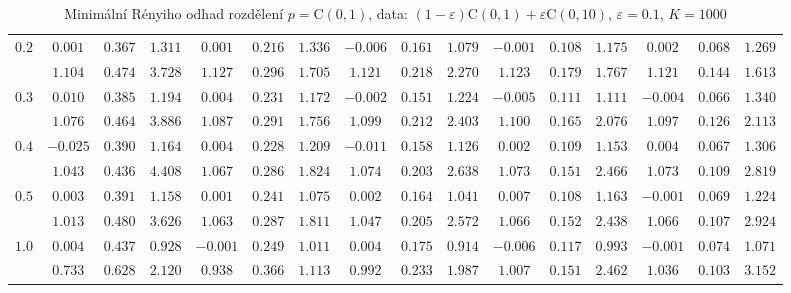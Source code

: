 \begin{table}[ht]
\begin{center}
\begin{tabular}{|c|ccc|ccc|ccc|ccc|ccc|}
\hline 
$0.2$ & $ 0.001 $ & $ 0.367 $ & $ 1.311 $ & $ 0.001 $ & $ 0.216 $ & $ 1.336 $ & $ -0.006 $ & $ 0.161 $ & $ 1.079 $ & $ -0.001 $ & $ 0.108 $ & $ 1.175 $ & $ 0.002 $ & $ 0.068 $ & $ 1.269 $\\ 
 & $ 1.104 $ & $ 0.474 $ & $ 3.728 $ & $ 1.127 $ & $ 0.296 $ & $ 1.705 $ & $ 1.121 $ & $ 0.218 $ & $ 2.270 $ & $ 1.123 $ & $ 0.179 $ & $ 1.767 $ & $ 1.121 $ & $ 0.144 $ & $ 1.613 $\\ 
\hline 
$0.3$ & $ 0.010 $ & $ 0.385 $ & $ 1.194 $ & $ 0.004 $ & $ 0.231 $ & $ 1.172 $ & $ -0.002 $ & $ 0.151 $ & $ 1.224 $ & $ -0.005 $ & $ 0.111 $ & $ 1.111 $ & $ -0.004 $ & $ 0.066 $ & $ 1.340 $\\ 
 & $ 1.076 $ & $ 0.464 $ & $ 3.886 $ & $ 1.087 $ & $ 0.291 $ & $ 1.756 $ & $ 1.099 $ & $ 0.212 $ & $ 2.403 $ & $ 1.100 $ & $ 0.165 $ & $ 2.076 $ & $ 1.097 $ & $ 0.126 $ & $ 2.113 $\\ 
\hline 
$0.4$ & $ -0.025 $ & $ 0.390 $ & $ 1.164 $ & $ 0.004 $ & $ 0.228 $ & $ 1.209 $ & $ -0.011 $ & $ 0.158 $ & $ 1.126 $ & $ 0.002 $ & $ 0.109 $ & $ 1.153 $ & $ 0.004 $ & $ 0.067 $ & $ 1.306 $\\ 
 & $ 1.043 $ & $ 0.436 $ & $ 4.408 $ & $ 1.067 $ & $ 0.286 $ & $ 1.824 $ & $ 1.074 $ & $ 0.203 $ & $ 2.638 $ & $ 1.073 $ & $ 0.151 $ & $ 2.466 $ & $ 1.073 $ & $ 0.109 $ & $ 2.819 $\\ 
\hline 
$0.5$ & $ 0.003 $ & $ 0.391 $ & $ 1.158 $ & $ 0.001 $ & $ 0.241 $ & $ 1.075 $ & $ 0.002 $ & $ 0.164 $ & $ 1.041 $ & $ 0.007 $ & $ 0.108 $ & $ 1.163 $ & $ -0.001 $ & $ 0.069 $ & $ 1.224 $\\ 
 & $ 1.013 $ & $ 0.480 $ & $ 3.626 $ & $ 1.063 $ & $ 0.287 $ & $ 1.811 $ & $ 1.047 $ & $ 0.205 $ & $ 2.572 $ & $ 1.066 $ & $ 0.152 $ & $ 2.438 $ & $ 1.066 $ & $ 0.107 $ & $ 2.924 $\\ 
\hline 
$1.0$ & $ 0.004 $ & $ 0.437 $ & $ 0.928 $ & $ -0.001 $ & $ 0.249 $ & $ 1.011 $ & $ 0.004 $ & $ 0.175 $ & $ 0.914 $ & $ -0.006 $ & $ 0.117 $ & $ 0.993 $ & $ -0.001 $ & $ 0.074 $ & $ 1.071 $\\ 
 & $ 0.733 $ & $ 0.628 $ & $ 2.120 $ & $ 0.938 $ & $ 0.366 $ & $ 1.113 $ & $ 0.992 $ & $ 0.233 $ & $ 1.987 $ & $ 1.007 $ & $ 0.151 $ & $ 2.462 $ & $ 1.036 $ & $ 0.103 $ & $ 3.152 $\\ 
\hline 
\end{tabular}
\caption{Minimální Rényiho odhad rozdělení $p = \mathrm{C}(0,1)$, data: $(1-\varepsilon)\mathrm{C}(0,1) + \varepsilon \mathrm{C}(0,10)$, $\varepsilon =  0.1$, $K = 1000$} 
\end{center}
\end{table}

